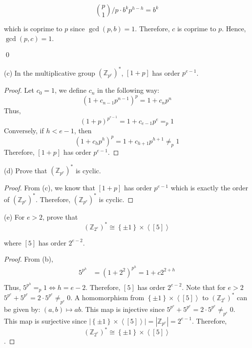 \documentclass{article}
\begin{document}
\[\binom{p}{1} \Big/ p\cdot b^kp^{h-h} = b^k\]

which is coprime to $p$ since $\gcd(p, b) = 1$. Therefore, $c$ is coprime to $p$. Hence, $\gcd(p, c) = 1$.

\qed

(c) In the multiplicative group $(\mathbb{Z}_{p^e})^{*}$, $[1+p]$ has order $p^{e-1}$.

\begin{proof}
    Let $c_0 = 1$, we define $c_n$ in the following way:
    \begin{equation*}
        (1 + c_{n-1}p^{n - 1})^{p} = 1 + c_{n}p^{n}
    \end{equation*}
    Thus,
    \begin{equation*}
        (1 + p)^{p^{e-1}} = 1 + c_{e-1}p^{e} =_p 1 
    \end{equation*}
    Conversely, if $h < e - 1$, then
    \begin{equation*}
        (1 + c_{h}p^{h})^{p} = 1 + c_{h+1}p^{h+1} \neq_p 1
    \end{equation*}
    Therefore, $[1+p]$ has order $p^{e-1}$.
\end{proof}

(d) Prove that $(\mathbb{Z}_{p^e})^{*}$ is cyclic.

\begin{proof}
    From (c), we know that $[1+p]$ has order $p^{e-1}$ which is exactly the order of $(\mathbb{Z}_{p^e})^{*}$. Therefore, $(\mathbb{Z}_{p^e})^{*}$ is cyclic.
\end{proof}

(e) For $e > 2$, prove that
\begin{equation*}
    \left(\mathbb{Z}_{2^e}\right)^{*} \cong \left\{\pm1\right\}\times \left<[5]\right>
\end{equation*}

where $[5]$ has order $2^{e-2}$.
\begin{proof}
    From (b), 
    \begin{align*}
        5^{p^{h}} &= (1 + 2^2)^{p^{h}} = 1 + c2^{2 + h}\\
    \end{align*}
    Thus, $5^{p^h} =_p 1 \iff h = e-2$. Therefore, $[5]$ has order $2^{e-2}$.
    Note that for $e > 2$ $5^{p^e} + 5^{p^e} = 2\cdot 5^{p^e}\neq_{p^e} 0$.
    A homomorphism from $\left\{\pm1\right\}\times \left<[5]\right>$ to $\left(\mathbb{Z}_{2^e}\right)^{*}$ can be given by: $(a, b)\mapsto ab$.
    This map is injective since $5^{p^e} + 5^{p^e} = 2\cdot 5^{p^e}\neq_{p^e} 0$. This map is surjective since $\left|\left\{\pm1\right\}\times \left<[5]\right>\right|=\left|\mathbb{Z}_{p^e}\right|=2^{e-1}$.
    Therefore, \[\left(\mathbb{Z}_{2^e}\right)^{*} \cong \left\{\pm1\right\}\times \left<[5]\right>\].

\end{proof}
\end{document}
